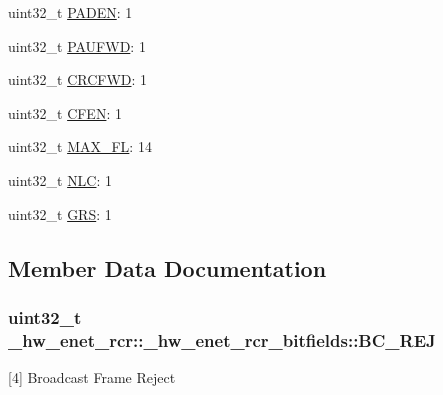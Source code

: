 \begin{DoxyCompactItemize}
\item 
uint32\+\_\+t \hyperlink{struct__hw__enet__rcr_1_1__hw__enet__rcr__bitfields_a6736161cfab2006488908f55251c72e5}{P\+A\+D\+EN}\+: 1
\item 
uint32\+\_\+t \hyperlink{struct__hw__enet__rcr_1_1__hw__enet__rcr__bitfields_abd3861d4140fc9f9870f5e782a289360}{P\+A\+U\+F\+WD}\+: 1
\item 
uint32\+\_\+t \hyperlink{struct__hw__enet__rcr_1_1__hw__enet__rcr__bitfields_aa92bce53f1818681c20ab534a9658f92}{C\+R\+C\+F\+WD}\+: 1
\item 
uint32\+\_\+t \hyperlink{struct__hw__enet__rcr_1_1__hw__enet__rcr__bitfields_ab8254c80a97b8156cbf2c0d2a3e2e95f}{C\+F\+EN}\+: 1
\item 
uint32\+\_\+t \hyperlink{struct__hw__enet__rcr_1_1__hw__enet__rcr__bitfields_adeaf92aaee9d3d066f01fd2a92acc0ba}{M\+A\+X\+\_\+\+FL}\+: 14
\item 
uint32\+\_\+t \hyperlink{struct__hw__enet__rcr_1_1__hw__enet__rcr__bitfields_a78824f211f362393ecc197f81d67c4e6}{N\+LC}\+: 1
\item 
uint32\+\_\+t \hyperlink{struct__hw__enet__rcr_1_1__hw__enet__rcr__bitfields_ae33d27ea9f662a9ef3193d96c8b4e154}{G\+RS}\+: 1
\end{DoxyCompactItemize}


\subsection{Member Data Documentation}
\subsubsection[{\texorpdfstring{B\+C\+\_\+\+R\+EJ}{BC_REJ}}]{\setlength{\rightskip}{0pt plus 5cm}uint32\+\_\+t \+\_\+hw\+\_\+enet\+\_\+rcr\+::\+\_\+hw\+\_\+enet\+\_\+rcr\+\_\+bitfields\+::\+B\+C\+\_\+\+R\+EJ}\hypertarget{struct__hw__enet__rcr_1_1__hw__enet__rcr__bitfields_a911335bcde3400228acf60ed629f8fc5}{}\label{struct__hw__enet__rcr_1_1__hw__enet__rcr__bitfields_a911335bcde3400228acf60ed629f8fc5}
\mbox{[}4\mbox{]} Broadcast Frame Reject 
